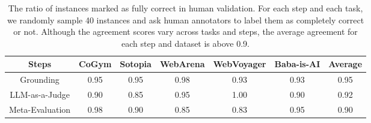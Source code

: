 \begin{table}[!t]
    \centering
    \small
    \begin{tabular}{cccccc|c}
        \toprule
        Steps & CoGym & Sotopia & WebArena & WebVoyager & Baba-is-AI & Average  \\
        \midrule
        Grounding & 0.95 & 0.95 & 0.98 & 0.93 & 0.93 & 0.95 \\
        LLM-as-a-Judge & 0.90 & 0.85 & 0.95 & 1.00 & 0.90 & 0.92 \\
        Meta-Evaluation & 0.98 & 0.90 & 0.85 & 0.83 & 0.95 &  0.90 \\
        \bottomrule
    \end{tabular}
    \caption{
        The ratio of instances marked as fully correct in human validation. For each step and
        each task, we randomly sample 40 instances and ask human annotators to label them as completely correct
        or not. Although the agreement scores vary across tasks and steps, the average agreement for each
        step and dataset is above 0.9. 
}
    \label{tab:validation}
\end{table}

